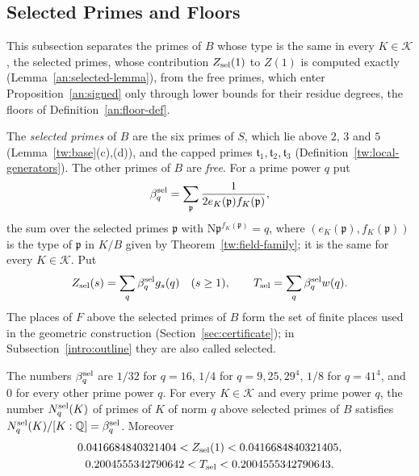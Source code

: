 \subsection{Selected Primes and Floors}\label{an:selected}
This subsection separates the primes of $B$ whose type is the same in every
$K\in\mathcal K$, the selected primes, whose contribution $Z_{\rm sel}(1)$
to $Z(1)$ is computed exactly (Lemma~\ref{an:selected-lemma}), from the free
primes, which enter Proposition~\ref{an:signed} only through lower bounds
for their residue degrees, the floors of Definition~\ref{an:floor-def}.

\begin{definition}\label{an:selected-def}
The \emph{selected primes} of $B$ are the six primes of $S$, which lie above
$2$, $3$ and $5$ (Lemma~\ref{tw:base}(c),(d)), and the capped primes
$\mathfrak t_1,\mathfrak t_2,\mathfrak t_3$
(Definition~\ref{tw:local-generators}). The other primes of $B$ are
\emph{free}. For a prime power $q$ put
\[
 \beta^{\rm sel}_q=\sum_{\mathfrak p}\frac1{2e_K(\mathfrak p)f_K(\mathfrak p)},
\]
the sum over the selected primes $\mathfrak p$ with
$\mathrm N\mathfrak p^{f_K(\mathfrak p)}=q$, where
$(e_K(\mathfrak p),f_K(\mathfrak p))$ is the type of $\mathfrak p$ in $K/B$
given by Theorem~\ref{tw:field-family}; it is the same for every
$K\in\mathcal K$. Put
\[
 Z_{\rm sel}(s)=\sum_q\beta^{\rm sel}_qg_s(q)\quad(s\ge1),\qquad
 T_{\rm sel}=\sum_q\beta^{\rm sel}_qw(q).
\]
The places of $F$ above the selected primes of $B$ form the set of finite
places used in the geometric construction (Section~\ref{sec:certificate});
in Subsection~\ref{intro:outline} they are also called selected.
\end{definition}

\begin{lemma}\label{an:selected-lemma}
The numbers $\beta^{\rm sel}_q$ are $1/32$ for $q=16$, $1/4$ for
$q=9,25,29^4$, $1/8$ for $q=41^4$, and $0$ for every other prime power $q$.
For every $K\in\mathcal K$ and every prime power $q$, the number
$N^{\rm sel}_q(K)$ of primes of $K$ of norm $q$ above selected primes of
$B$ satisfies $N^{\rm sel}_q(K)/[K:\mathbb Q]=\beta^{\rm sel}_q$. Moreover
\begin{gather*}
 0.0416684840321404<Z_{\rm sel}(1)<0.0416684840321405,\\
 0.2004555342790642<T_{\rm sel}<0.2004555342790643.
\end{gather*}
\end{lemma}

